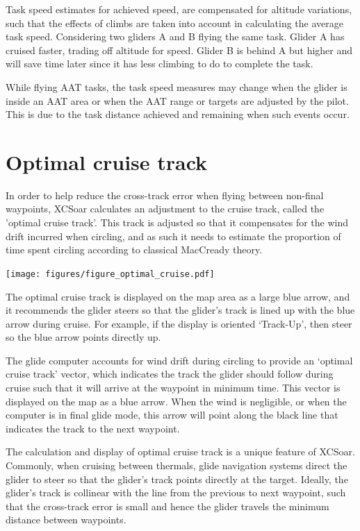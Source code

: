 Task speed estimates for achieved speed, are compensated for altitude
variations, such that the effects of climbs are taken into account in
calculating the average task speed.  Considering two gliders A and B
flying the same task.  Glider A has cruised faster, trading off altitude
for speed.  Glider B is behind A but higher and will save time later
since it has less climbing to do to complete the task.

While flying AAT tasks, the task speed measures may change when the
glider is inside an AAT area or when the AAT range or targets are
adjusted by the pilot.  This is due to the task distance achieved and
remaining when such events occur.


\section{Optimal cruise track}

In order to help reduce the cross-track error when flying between
non-final waypoints, XCSoar calculates an adjustment to the cruise
track, called the 'optimal cruise track'.  This track is adjusted so
that it compensates for the wind drift incurred when circling, and as
such it needs to estimate the proportion of time spent circling
according to classical MacCready theory.

\begin{center}
\begin{maxipage}
\centering
\def\svgwidth{0.8\linewidth}
\texttt{[image: figures/figure\_optimal\_cruise.pdf]}
\end{maxipage}
\end{center}

The optimal cruise track is displayed on the map area as a large blue
arrow, and it recommends the glider steers so that the glider's track
is lined up with the blue arrow during cruise.  For example, if the
display is oriented `Track-Up', then steer so the blue arrow points
directly up.

The glide computer accounts for wind drift during circling to provide
an `optimal cruise track' vector, which indicates the track the glider
should follow during cruise such that it will arrive at the waypoint
in minimum time.  This vector is displayed on the map as a blue arrow.
When the wind is negligible, or when the computer is in final glide
mode, this arrow will point along the black line that indicates the
track to the next waypoint.

The calculation and display of optimal cruise track is a unique
feature of XCSoar.  Commonly, when cruising between thermals, glide
navigation systems direct the glider to steer so that the glider's
track points directly at the target.  Ideally, the glider's track is
collinear with the line from the previous to next waypoint, such that
the cross-track error is small and hence the glider travels the
minimum distance between waypoints.

